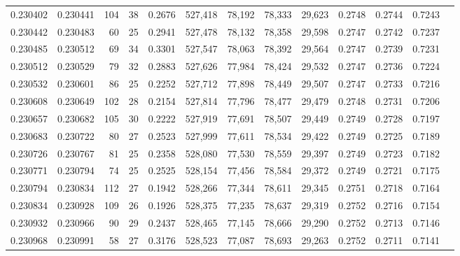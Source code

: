 \begin{tabular}{rrrrrrrrrrrrr}
0.230402 & 0.230441 & 104 &  38 &                                     0.2676 & 527,418 &  78,192 &  78,333 &  29,623 & 0.2748 & 0.2744 & 0.7243 \\
0.230442 & 0.230483 &  60 &  25 &                                     0.2941 & 527,478 &  78,132 &  78,358 &  29,598 & 0.2747 & 0.2742 & 0.7237 \\
0.230485 & 0.230512 &  69 &  34 &                                     0.3301 & 527,547 &  78,063 &  78,392 &  29,564 & 0.2747 & 0.2739 & 0.7231 \\
0.230512 & 0.230529 &  79 &  32 &                                     0.2883 & 527,626 &  77,984 &  78,424 &  29,532 & 0.2747 & 0.2736 & 0.7224 \\
0.230532 & 0.230601 &  86 &  25 &                                     0.2252 & 527,712 &  77,898 &  78,449 &  29,507 & 0.2747 & 0.2733 & 0.7216 \\
0.230608 & 0.230649 & 102 &  28 &                                     0.2154 & 527,814 &  77,796 &  78,477 &  29,479 & 0.2748 & 0.2731 & 0.7206 \\
0.230657 & 0.230682 & 105 &  30 &                                     0.2222 & 527,919 &  77,691 &  78,507 &  29,449 & 0.2749 & 0.2728 & 0.7197 \\
0.230683 & 0.230722 &  80 &  27 &                                     0.2523 & 527,999 &  77,611 &  78,534 &  29,422 & 0.2749 & 0.2725 & 0.7189 \\
0.230726 & 0.230767 &  81 &  25 &                                     0.2358 & 528,080 &  77,530 &  78,559 &  29,397 & 0.2749 & 0.2723 & 0.7182 \\
0.230771 & 0.230794 &  74 &  25 &                                     0.2525 & 528,154 &  77,456 &  78,584 &  29,372 & 0.2749 & 0.2721 & 0.7175 \\
0.230794 & 0.230834 & 112 &  27 &                                     0.1942 & 528,266 &  77,344 &  78,611 &  29,345 & 0.2751 & 0.2718 & 0.7164 \\
0.230834 & 0.230928 & 109 &  26 &                                     0.1926 & 528,375 &  77,235 &  78,637 &  29,319 & 0.2752 & 0.2716 & 0.7154 \\
0.230932 & 0.230966 &  90 &  29 &                                     0.2437 & 528,465 &  77,145 &  78,666 &  29,290 & 0.2752 & 0.2713 & 0.7146 \\
0.230968 & 0.230991 &  58 &  27 &                                     0.3176 & 528,523 &  77,087 &  78,693 &  29,263 & 0.2752 & 0.2711 & 0.7141 \\

\end{tabular}

